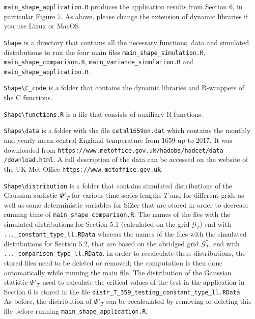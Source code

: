 \documentclass[a4paper,12pt]{article}
\begin{document}
\verb|main_shape_application.R| \hspace{1pt} produces the application results from Section 6, in particular Figure 7. As above, please change the extension of dynamic libraries if you use Linux or MacOS.

\verb|Shape| \hspace{1pt} is a directory that contains all the necessary functions, data and simulated distributions to run the four main files \verb|main_shape_simulation.R|, \verb|main_shape_comparison.R|, \verb|main_variance_simulation.R|  and \linebreak \verb|main_shape_application.R|.

\verb|Shape\C_code| \hspace{1pt} is a folder that contains the dynamic libraries and R-wrappers of the C functions.

\verb|Shape\functions.R| \hspace{1pt} is a file that consists of auxiliary R functions.

\verb|Shape\data| \hspace{1pt} is a folder with the file \verb|cetml1659on.dat| which contains the monthly and yearly mean central England temperature from 1659 up to 2017. It was downloaded from \verb|https://www.metoffice.gov.uk/hadobs/hadcet/data| \verb|/download.html|. A full description of the data can be accessed on the website of the UK Met Office \verb|https://www.metoffice.gov.uk|. 

\verb|Shape\distribution| \hspace{1pt} is a folder that  contains simulated distributions of the Gaussian statistic $\Phi'_{T}$ for various time series lengths $T$ and for different grids as well as some deterministic variables for SiZer that are stored in order to decrease running time of \verb|main_shape_comparison.R|. The names of the fles with the simulated distributions for Section 5.1 (calculated on the grid $\mathcal{G}_T$) end with \verb|..._constant_type_ll.RData| whereas the names of the files with the simulated distributions for Section 5.2, that are based on the abridged grid $\mathcal{G}^*_T$, end with \verb|..._comparison_type_ll.RData|. In order to recalculate these distributions, the stored files need to be deleted or removed; the computation is then done automatically while running the main file. The distribution of the Gaussian statistic $\Phi'_T$ used to calculate the critical values of the test in the application in Section 6 is stored in the file \verb|distr_T_359_testing_constant_type_ll.RData|. As before, the distribution of $\Phi'_T$ can be recalculated by removing or deleting this file before running \verb|main_shape_application.R|. 
\end{document}
